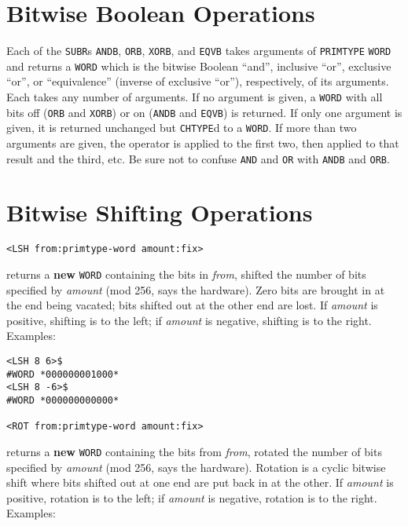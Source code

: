 \documentclass[a4paper]{scrbook}
\begin{document}
\section{Bitwise Boolean Operations}\label{bitwise-boolean-operations}

Each of the \texttt{SUBR}s \texttt{ANDB}, \texttt{ORB},
\texttt{XORB}, and \texttt{EQVB} takes arguments of
\texttt{PRIMTYPE} \texttt{WORD} and returns a \texttt{WORD} which is the bitwise Boolean ``and'', inclusive ``or'',
exclusive ``or'', or ``equivalence'' (inverse of exclusive ``or''), respectively, of its arguments. Each takes any number
of arguments. If no argument is given, a \texttt{WORD} with all bits off (\texttt{ORB} and \texttt{XORB}) or on
(\texttt{ANDB} and \texttt{EQVB}) is returned. If only one argument is given, it is returned unchanged but \texttt{CHTYPE}d
to a \texttt{WORD}. If more than two arguments are given, the operator is applied to the first two, then applied to that
result and the third, etc. Be sure not to confuse \texttt{AND} and \texttt{OR} with \texttt{ANDB} and \texttt{ORB}.

\section{Bitwise Shifting Operations}\label{bitwise-shifting-operations}

\begin{verbatim}
<LSH from:primtype-word amount:fix>
\end{verbatim}

 returns a \textbf{new} \texttt{WORD} containing the bits in \emph{from}, shifted the number of
bits specified by \emph{amount} (mod 256, says the hardware). Zero bits are brought in at the end being vacated; bits
shifted out at the other end are lost. If \emph{amount} is positive, shifting is to the left; if \emph{amount} is negative,
shifting is to the right. Examples:

\begin{verbatim}
<LSH 8 6>$
#WORD *000000001000*
<LSH 8 -6>$
#WORD *000000000000*

<ROT from:primtype-word amount:fix>
\end{verbatim}

 returns a \textbf{new} \texttt{WORD} containing the bits from \emph{from}, rotated the number
of bits specified by \emph{amount} (mod 256, says the hardware). Rotation is a cyclic bitwise shift where bits shifted out
at one end are put back in at the other. If \emph{amount} is positive, rotation is to the left; if \emph{amount} is
negative, rotation is to the right. Examples:
\end{document}
